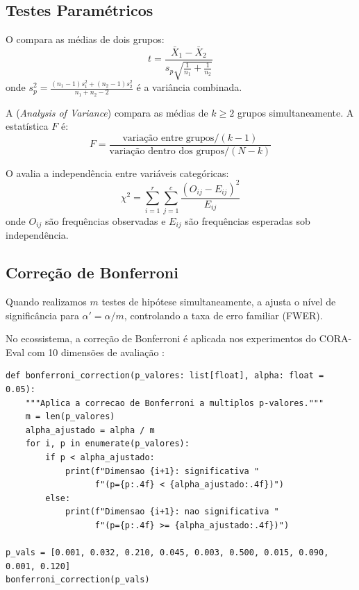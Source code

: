 \subsection{Testes Paramétricos}

\begin{definicao}
    O  compara as médias de dois grupos:
    \[
    t = \frac{\bar{X}_1 - \bar{X}_2}{s_p \sqrt{\frac{1}{n_1} + \frac{1}{n_2}}}
    \]
    onde $s_p^2 = \frac{(n_1-1)s_1^2 + (n_2-1)s_2^2}{n_1 + n_2 - 2}$ é a
    variância combinada.
\end{definicao}

\begin{definicao}[ANOVA]
    A  (\textit{Analysis of Variance}) compara as médias de
    $k \geq 2$ grupos simultaneamente. A estatística $F$ é:
    \[
    F = \frac{\text{variação entre grupos} / (k-1)}
    {\text{variação dentro dos grupos} / (N - k)}
    \]
\end{definicao}

\begin{definicao}
    O  avalia a independência entre variáveis
    categóricas:
    \[
    \chi^2 = \sum_{i=1}^{r} \sum_{j=1}^{c}
    \frac{(O_{ij} - E_{ij})^2}{E_{ij}}
    \]
    onde $O_{ij}$ são frequências observadas e $E_{ij}$ são frequências
    esperadas sob independência.
\end{definicao}

\subsection{Correção de Bonferroni}

\begin{definicao}
    Quando realizamos $m$ testes de hipótese simultaneamente, a
     ajusta o nível de significância para
    $\alpha' = \alpha / m$, controlando a taxa de erro familiar (FWER).
\end{definicao}

\begin{exemplo}
    No ecossistema, a correção de Bonferroni é aplicada nos experimentos
    do CORA-Eval com 10 dimensões de avaliação \cite{laranjeira2026cora}:
    \begin{lstlisting}[style=pythonstyle]
def bonferroni_correction(p_valores: list[float], alpha: float = 0.05):
    """Aplica a correcao de Bonferroni a multiplos p-valores."""
    m = len(p_valores)
    alpha_ajustado = alpha / m
    for i, p in enumerate(p_valores):
        if p < alpha_ajustado:
            print(f"Dimensao {i+1}: significativa "
                  f"(p={p:.4f} < {alpha_ajustado:.4f})")
        else:
            print(f"Dimensao {i+1}: nao significativa "
                  f"(p={p:.4f} >= {alpha_ajustado:.4f})")

p_vals = [0.001, 0.032, 0.210, 0.045, 0.003, 0.500, 0.015, 0.090, 0.001, 0.120]
bonferroni_correction(p_vals)
    \end{lstlisting}
\end{exemplo}

